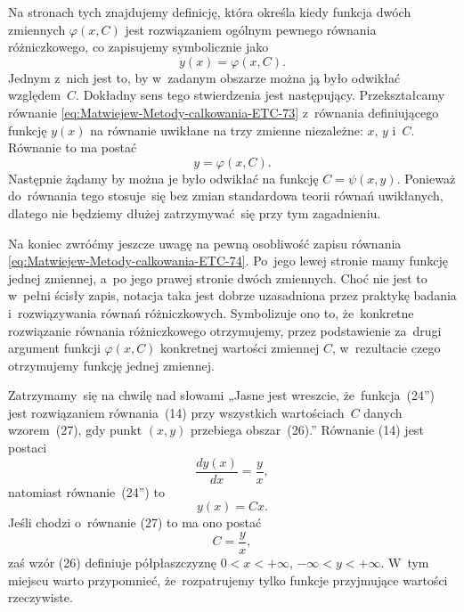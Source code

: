 \documentclass[a4paper,11pt]{article}
\numberwithin{equation}{section}
\begin{document}
\VerSpaceFour





\noindent
{} Na stronach tych znajdujemy definicję, która określa kiedy
funkcja dwóch zmiennych $\varphi( x, C )$ jest rozwiązaniem ogólnym pewnego
równania różniczkowego, co zapisujemy symbolicznie jako
\begin{equation}
  \label{eq:Uwagi-do-konkrentych-stron-55}
  y( x ) = \varphi( x, C ).
\end{equation}
Jednym z~nich jest to, by w~zadanym obszarze można ją było odwikłać
względem~$C$. Dokładny sens tego stwierdzenia jest następujący.
Przekształcamy równanie \eqref{eq:Matwiejew-Metody-calkowania-ETC-73}
z~równania definiującego funkcję $y( x )$ na równanie uwikłane na trzy
zmienne niezależne: $x$, $y$ i~$C$. Równanie to ma postać
\begin{equation}
  \label{eq:Uwagi-do-konkrentych-stron-56}
  y = \varphi( x, C ).
\end{equation}
Następnie żądamy by można je było odwikłać na funkcję $C = \psi( x, y )$.
Ponieważ do~równania tego stosuje~się bez zmian standardowa teorii równań
uwikłanych, dlatego nie będziemy dłużej zatrzymywać~się przy tym
zagadnieniu.

Na koniec zwróćmy jeszcze uwagę na pewną osobliwość zapisu równania
\eqref{eq:Matwiejew-Metody-calkowania-ETC-74}. Po~jego lewej stronie mamy
funkcję jednej zmiennej, a~po jego prawej stronie dwóch zmiennych. Choć nie
jest to w~pełni ścisły zapis, notacja taka jest dobrze uzasadniona
przez praktykę badania i~rozwiązywania równań różniczkowych. Symbolizuje
ono to, że~konkretne rozwiązanie równania różniczkowego otrzymujemy, przez
podstawienie za~drugi argument funkcji $\varphi( x, C )$ konkretnej wartości
zmiennej $C$, w~rezultacie czego otrzymujemy funkcję jednej zmiennej.

\VerSpaceFour





\noindent
{} Zatrzymamy~się na chwilę nad słowami „Jasne jest wreszcie,
że~funkcja~(24'') jest rozwiązaniem równania~(14) przy wszystkich
wartościach~$C$ danych wzorem~(27), gdy punkt $( x, y )$ przebiega
obszar~(26).” Równanie (14) jest postaci
\begin{equation}
  \label{eq:Uwagi-do-konkrentych-stron-57}
  \frac{ d y( x ) }{ dx } = \frac{ y }{ x },
\end{equation}
natomiast równanie~(24'') to
\begin{equation}
  \label{eq:Uwagi-do-konkrentych-stron-58}
  y( x ) = C x.
\end{equation}
Jeśli chodzi o~równanie (27) to ma ono postać
\begin{equation}
  \label{eq:Uwagi-do-konkrentych-stron-59}
  C = \frac{ y }{ x },
\end{equation}
zaś wzór (26) definiuje półpłaszczyznę $0 < x < +\infty$, $-\infty < y < +\infty$.
W~tym miejscu warto przypomnieć, że~rozpatrujemy tylko funkcje przyjmujące
wartości rzeczywiste.
\end{document}
